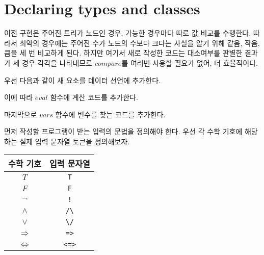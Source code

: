 \chapter{\Large{Declaring types and classes}}



이전 구현은 주어진 트리가 노드인 경우, 가능한 경우마다 따로 값 비교를
수행한다. 따라서 최악의 경우에는 주어진 수가 노드의 수보다 크다는 사실을 알기
위해 같음, 작음, 큼을 세 번 비교하게 된다. 하지만 여기서 새로 작성한
코드는 대소여부를 판별한 결과가 세 경우 각각을 나타내므로 $compare$를
여러번 사용할 필요가 없어, 더 효율적이다.



우선 다음과 같이 새 요소를 데이터 선언에 추가한다.

이에 따라 $eval$ 함수에 계산 코드를 추가한다.

마지막으로 $vars$ 함수에 변수를 찾는 코드를 추가한다.


먼저 작성할 프로그램이 받는 입력의 문법을 정의해야 한다. 우선 각
수학 기호에 해당하는 실제 입력 문자열 토큰을 정의해보자.

\begin{center}
  \begin{tabular}{cc}
    수학 기호          & 입력 문자열 \\
    \hline
    $T$               & \texttt{T} \\
    $F$               & \texttt{F} \\
    $\neg$            & \texttt{!} \\
    $\wedge$          & \texttt{/\textbackslash} \\
    $\vee$            & \texttt{\textbackslash/} \\
    $\Rightarrow$     & \texttt{=>} \\
    $\Leftrightarrow$ & \texttt{<=>} \\
  \end{tabular}
\end{center}

